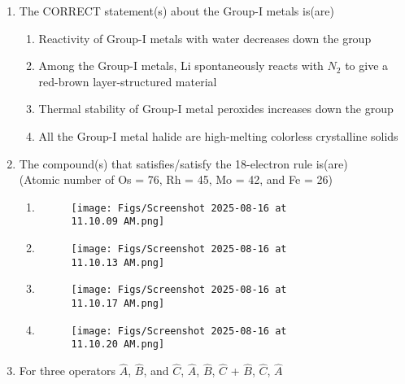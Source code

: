 \documentclass[12pt]{article}
\begin{document}
\begin{enumerate}
\item The CORRECT statement(s) about the Group-I metals is(are)

\begin{enumerate}
    \item Reactivity of Group-I metals with water decreases down the group
    \item Among the Group-I metals, Li spontaneously reacts with $N_2$ to give a red-brown
layer-structured material
\item Thermal stability of Group-I metal peroxides increases down the group
\item All the Group-I metal halide are high-melting colorless crystalline solids
\end{enumerate}


\item The compound(s) that satisfies/satisfy the 18-electron rule is(are) \\

(Atomic number of Os = 76, Rh = 45, Mo = 42, and Fe = 26)

\begin{enumerate} 
    \item \begin{figure}[H]
\centering
\texttt{[image: Figs/Screenshot 2025-08-16 at 11.10.09 AM.png]}
\caption{}
\end{figure}

\item  \begin{figure}[H]
\centering
\texttt{[image: Figs/Screenshot 2025-08-16 at 11.10.13 AM.png]}
\caption{}
\end{figure}


\item  \begin{figure}[H]
\centering
\texttt{[image: Figs/Screenshot 2025-08-16 at 11.10.17 AM.png]}
\caption{}
\end{figure}

\item  
\begin{figure}[H]
\centering
\texttt{[image: Figs/Screenshot 2025-08-16 at 11.10.20 AM.png]}
\caption{}
\end{figure}

\end{enumerate}



    
\item For three operators $\hat{A}$, $\hat{B}$, and $\hat{C}$,  {$\hat{A}$,  {$\hat{B}$, $\hat{C}$}} +  {$\hat{B}$,  {$\hat{C}$, $\hat{A}$}}


\end{enumerate}
\end{document}
